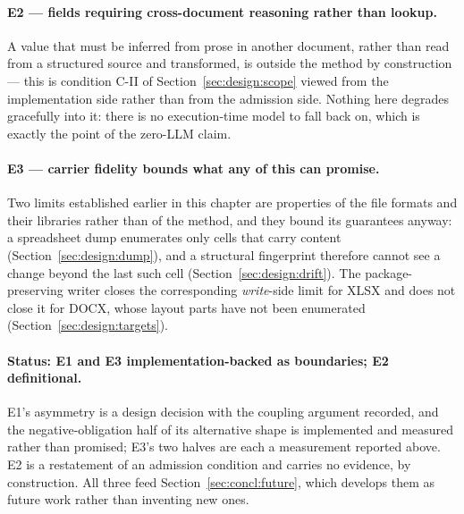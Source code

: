\paragraph{E2 --- fields requiring cross-document reasoning rather than lookup.}
A value that must be inferred from prose in another document, rather than read from a structured
source and transformed, is outside the method by construction --- this is condition C-II of
Section~\ref{sec:design:scope} viewed from the implementation side rather than from the admission
side. Nothing here degrades gracefully into it: there is no execution-time model to fall back on,
which is exactly the point of the zero-LLM claim.

\paragraph{E3 --- carrier fidelity bounds what any of this can promise.}
Two limits established earlier in this chapter are properties of the file formats and their
libraries rather than of the method, and they bound its guarantees anyway: a spreadsheet dump
enumerates only cells that carry content (Section~\ref{sec:design:dump}), and a structural
fingerprint therefore cannot see a change beyond the last such cell
(Section~\ref{sec:design:drift}). The package-preserving writer closes the corresponding
\emph{write}-side limit for XLSX and does not close it for DOCX, whose layout parts have not been
enumerated (Section~\ref{sec:design:targets}).

\paragraph{Status: E1 and E3 implementation-backed as boundaries; E2 definitional.}
E1's asymmetry is a design decision with the coupling argument recorded, and the negative-obligation
half of its alternative shape is implemented and measured rather than promised; E3's two halves are
each a measurement reported above. E2 is a restatement of an admission condition and carries no
evidence, by construction. All three feed Section~\ref{sec:concl:future}, which develops them as
future work rather than inventing new ones.
